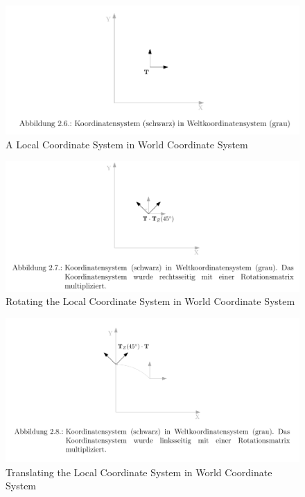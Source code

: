 \documentclass[a4paper]{report}
\numberwithin{figure}{section}
\begin{document}
\begin{figure}[H]
	\centering
	\includegraphics[width=\linewidth,natwidth=640,natheight=640]
	{fig/ref_imgs/2d_local_coords_in_world_coords.png}
  \caption{A Local Coordinate System in World Coordinate System}
	\label{fig:2d_local_coords_in_world_coords}
\end{figure}

\begin{figure}[H]
	\centering
	\includegraphics[width=\linewidth,natwidth=640,natheight=640]
	{fig/ref_imgs/2d_rotation.png}
  \caption{Rotating the Local Coordinate System in World Coordinate System}
	\label{fig:2d_rotation}
\end{figure}

\begin{figure}[H]
	\centering
	\includegraphics[width=\linewidth,natwidth=640,natheight=640]
	{fig/ref_imgs/2d_translation.png}
  \caption{Translating the Local Coordinate System in World Coordinate System}
	\label{fig:2d_rotation}
\end{figure}
\end{document}
